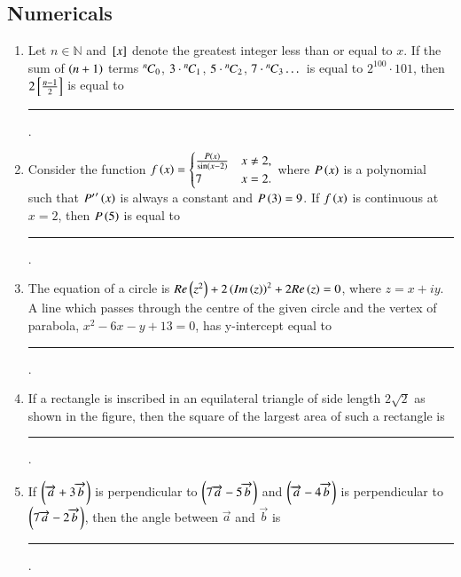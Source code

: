 \documentclass[journal,12pt,onecolumn]{IEEEtran}
\theoremstyle{remark}
\begin{document}
\subsection{Numericals}
\begin{enumerate}

\item Let $n\in \mathbb{N}$ and ${}\left[x\right]$ denote the greatest integer less than or equal to $x$. If the sum of $\left(n+1\right)$ terms ${{}^{n}\mkern-1muC_{0}}$, $3\cdot{{}^{n}\mkern-1muC_{1}}$, $5\cdot{{}^{n}\mkern-1muC_{2}}$, $7\cdot{{}^{n}\mkern-1muC_{3}} \dots$ is equal to $2^{100}\cdot 101$, then $2{}\left[\frac{n-1}{2}\right]$ is equal to \rule{1cm}{0.15mm}.

\hfill{}

\item Consider the function $f\left(x\right) = \begin{cases} \frac{P\left(x\right)}{\sin\left(x-2\right)} & x\neq 2, \\7 & x=2 .\end{cases}$ where $P\left(x\right)$ is a polynomial such that ${P^\prime}^\prime\left(x\right)$ is always a constant and $P\left(3\right)=9$. If $f\left(x\right)$ is continuous at $x=2$, then $P\left(5\right)$ is equal to \rule{1cm}{0.15mm}.

\hfill{}

\item The equation of a circle is $Re\left(z^2\right)+2\left(Im\left(z\right)\right)^2+2Re\left(z\right)=0$, where $z=x+iy$. A line which passes through the centre of the given circle and the vertex of parabola, $x^2-6x-y+13=0$, has y-intercept equal to \rule{1cm}{0.15mm}.

\hfill{}

\item If a rectangle is inscribed in an equilateral triangle of side length $2\sqrt{2}$ as shown in the figure, then the square of the largest area of such a rectangle is \rule{1cm}{0.15mm}.

\hfill{}

\item If $\left(\overrightarrow{a}+3\overrightarrow{b}\right)$ is perpendicular to $\left(7\overrightarrow{a}-5\overrightarrow{b}\right)$ and $\left(\overrightarrow{a}-4\overrightarrow{b}\right)$ is perpendicular to $\left(7\overrightarrow{a}-2\overrightarrow{b}\right)$, then the angle between $\overrightarrow{a}$ and $\overrightarrow{b}$  is \rule{1cm}{0.15mm}.

\hfill{}


\end{enumerate}
\end{document}
